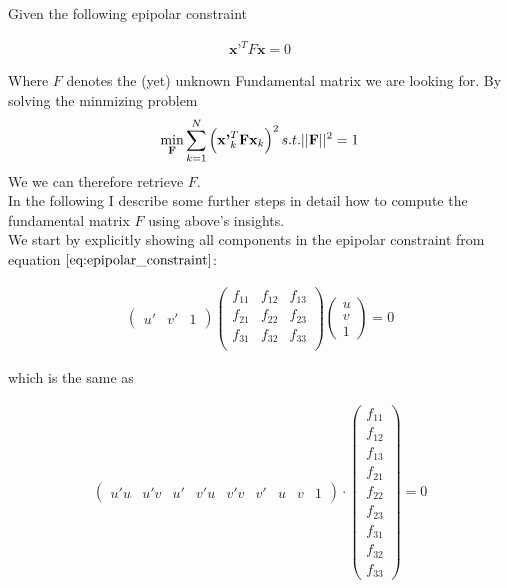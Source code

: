 \documentclass{paper}
\begin{document}
Given the following epipolar constraint 

\begin{align}
    \textbf{x'}^{T} F \textbf{x} = 0
\label{eq:epipolar_constraint}
\end{align}

Where $F$ denotes the (yet) unknown Fundamental matrix we are looking for. By solving the minmizing problem 
\begin{align}
    \min_{\bf{F}} \sum^{N}_{k=1} \left(\textbf{x'}_{k}^{T} \textbf{F} \textbf{x}_{k}\right)^2 s.t. ||\textbf{F}||^2 = 1
\label{eq:min_problem}
\end{align}
 We we can therefore retrieve $F$. \\
 In the following I describe some further steps in detail how to compute the fundamental matrix $F$ using above's insights. \\

We start by explicitly showing all components in the epipolar constraint from equation $\ref{eq:epipolar_constraint}$: 

\begin{align}
\left(\begin{array}{ccc}
u' & v' & 1
\end{array}
\right)
\left(\begin{array}{ccc}
f_{11} & f_{12} & f_{13} \\
f_{21} & f_{22} & f_{23} \\
f_{31} & f_{32} & f_{33} \\
\end{array} \right)
\left(\begin{array}{c}
u \\
v \\
1
\end{array}
\right)
= 0
\label{eq:fundamental_matrix_block_form}
\end{align}

which is the same as

\begin{align*}
\left(\begin{array}{ccccccccc}
u' u & u' v & u' & v' u & v' v & v' & u & v & 1
\end{array}
\right)
\cdot
\left(\begin{array}{c}
f_{11} \\
f_{12} \\
f_{13} \\
f_{21} \\
f_{22} \\
f_{23} \\
f_{31} \\
f_{32} \\
f_{33}
\end{array}
\right)
= 0
\end{align*}
\end{document}
